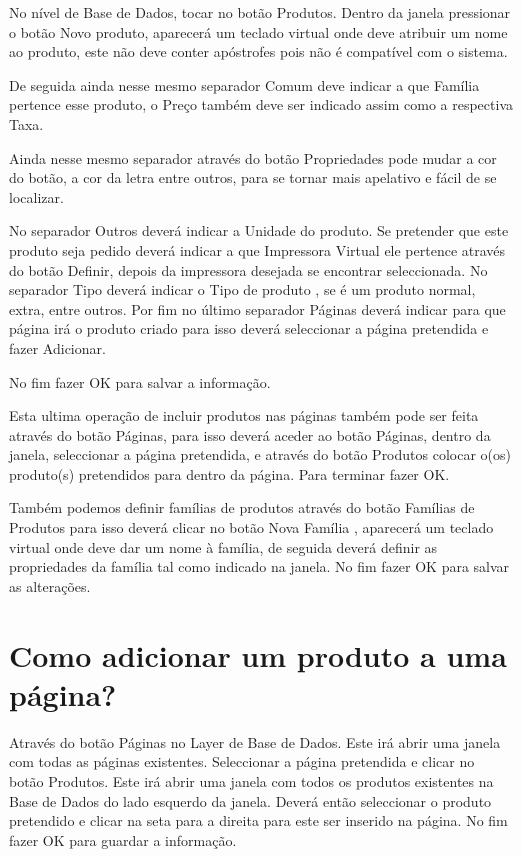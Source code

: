 \documentclass[a4paper,11pt,openany]{memoir}
\begin{document}
No nível de Base de Dados, tocar no botão Produtos. Dentro da janela pressionar o
botão Novo produto, aparecerá um teclado virtual onde deve atribuir um nome ao
produto, este não deve conter apóstrofes pois não é compatível com o sistema.

De seguida ainda nesse mesmo separador Comum deve indicar a que Família pertence
esse produto, o Preço também deve ser indicado assim como a respectiva Taxa.

Ainda nesse mesmo separador através do botão Propriedades pode mudar a cor do
botão, a cor da letra entre outros, para se tornar mais apelativo e fácil de se
localizar. 

No separador Outros deverá indicar a Unidade do produto. Se pretender
que este produto seja pedido deverá indicar a que Impressora Virtual ele pertence
através do botão Definir, depois da impressora desejada se encontrar seleccionada.
No separador Tipo deverá indicar o Tipo de produto , se é um produto normal, extra,
entre outros. Por fim no último separador Páginas deverá indicar para que página irá
o produto criado para isso deverá seleccionar a página pretendida e fazer Adicionar.

No fim fazer OK para salvar a informação. 

Esta ultima operação de incluir produtos
nas páginas também pode ser feita através do botão Páginas, para isso deverá
aceder ao botão Páginas, dentro da janela, seleccionar a página pretendida, e
através do botão Produtos colocar o(os) produto(s) pretendidos para dentro da
página. Para terminar fazer OK. 

Também podemos definir famílias de produtos
através do botão Famílias de Produtos para isso deverá clicar no botão Nova
Família , aparecerá um teclado virtual onde deve dar um nome à família, de seguida
deverá definir as propriedades da família tal como indicado na janela. No fim fazer
OK para salvar as alterações.

\section{Como adicionar um produto a uma página?}
Através do botão Páginas no Layer de Base de Dados. Este irá abrir uma janela com
todas as páginas existentes. Seleccionar a página pretendida e clicar no botão
Produtos. Este irá abrir uma janela com todos os produtos existentes na Base de
Dados do lado esquerdo da janela. Deverá então seleccionar o produto pretendido e
clicar na seta para a direita para este ser inserido na página. No fim fazer OK para
guardar a informação.
\end{document}
